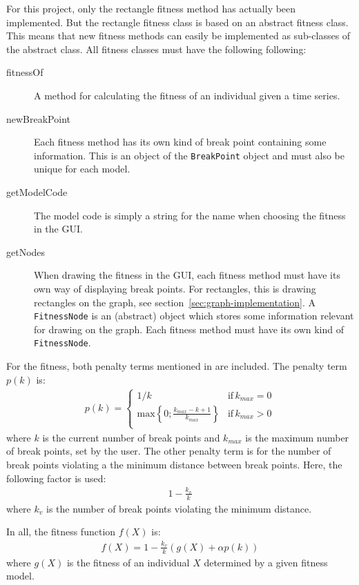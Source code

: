 For this project, only the rectangle fitness method has actually been
implemented. But the rectangle fitness class is based on an abstract fitness
class. This means that new fitness methods can easily be implemented as
sub-classes of the abstract class. All fitness classes must have the following
following: 
\begin{description}
    \item[fitnessOf] A method for calculating the fitness of an individual given
    a time series. 
    \item[newBreakPoint] Each fitness method has its own kind of break point
    containing some information. This is an object of the \texttt{BreakPoint}
    object and must also be unique for each model. 
    \item[getModelCode] The model code is simply a string for the name when
    choosing the fitness in the GUI. 
    \item[getNodes] When drawing the fitness in the GUI, each fitness method
    must have its own way of displaying break points. For rectangles, this is
    drawing rectangles on the graph, see section~\ref{sec:graph-implementation}.
    A \texttt{FitnessNode} is an (abstract) object which stores some information
    relevant for drawing on the graph. Each fitness method must have its own
    kind of \texttt{FitnessNode}. 
\end{description}

For the fitness, both penalty terms mentioned in \cite{doerr2017a} are included.
The penalty term $p(k)$ is:
\begin{align}
    p(k) = \begin{cases}
        1/k & \text{if} \, k_{max} = 0 \\
        \text{max} \left \{ 0;\frac{k_{max} - k + 1}{k_{max}} \right \} & \text{if} \, k_{max} > 0 \\
    \end{cases}
\end{align}
where $k$ is the current number of break points and $k_{max}$ is the maximum
number of break points, set by the user. The other penalty term is for the
number of break points violating a the minimum distance between break points.
Here, the following factor is used:
\begin{align}
    1 - \frac{k_v}{k}
\end{align}
where $k_v$ is the number of break points violating the minimum distance. 

In all, the fitness function $f(X)$ is:
\begin{align}
    f(X) = 1 - \frac{k_v}{k} (g(X) + \alpha p(k))
\end{align}
where $g(X)$ is the fitness of an individual $X$ determined by a given fitness
model. 

